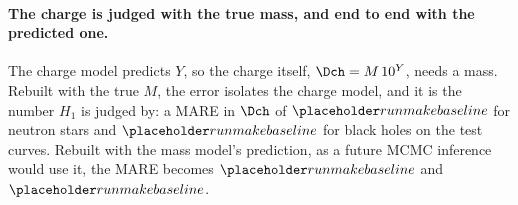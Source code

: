 \paragraph{The charge is judged with the true mass, and end to end with the predicted one.}
The charge model predicts $Y$, so the charge itself, $\Dch = M\,10^{Y}$, needs a mass. Rebuilt with the true $M$, the error isolates the charge model, and it is the number $H_1$ is judged by: a MARE in $\Dch$ of $\baseNsChargeMareTrueM$ for neutron stars and $\baseBhChargeMareTrueM$ for black holes on the test curves. Rebuilt with the mass model's prediction, as a future MCMC inference would use it, the MARE becomes $\baseNsChargeMarePredM$ and $\baseBhChargeMarePredM$.

\FloatBarrier
